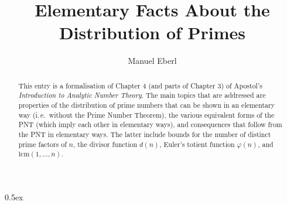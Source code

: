 \documentclass[11pt,a4paper]{article}
\begin{document}
\title{Elementary Facts About the Distribution of Primes}
\author{Manuel Eberl}
\maketitle

\begin{abstract}
This entry is a formalisation of Chapter 4 (and parts of Chapter 3) of Apostol's \emph{Introduction to Analytic Number Theory}. The main topics that are addressed are properties of the distribution of prime numbers that can be shown in an elementary way (i.\,e.\ without the Prime Number Theorem), the various equivalent forms of the PNT (which imply each other in elementary ways), and consequences that follow from the PNT in elementary ways. The latter include bounds for the number of distinct prime factors of $n$, the divisor function $d(n)$, Euler's totient function $\varphi(n)$, and $\text{lcm}(1,\ldots,n)$.
\end{abstract}

\newpage
\tableofcontents
\newpage
\parindent 0pt\parskip 0.5ex



\nocite{apostol1976analytic}


\end{document}
